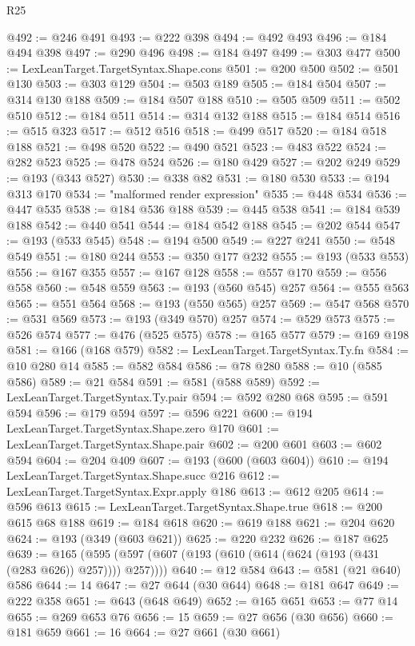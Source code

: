 \begin{lexlean}{R25}
\begin{coremodule}
@492 := @246 @491
@493 := @222 @398
@494 := @492 @493
@496 := @184 @494 @398
@497 := @290 @496
@498 := @184 @497
@499 := @303 @477
@500 := LexLeanTarget.TargetSyntax.Shape.cons
@501 := @200 @500
@502 := @501 @130
@503 := @303 @129
@504 := @503 @189
@505 := @184 @504
@507 := @314 @130 @188
@509 := @184 @507 @188
@510 := @505 @509
@511 := @502 @510
@512 := @184 @511
@514 := @314 @132 @188
@515 := @184 @514
@516 := @515 @323
@517 := @512 @516
@518 := @499 @517
@520 := @184 @518 @188
@521 := @498 @520
@522 := @490 @521
@523 := @483 @522
@524 := @282 @523
@525 := @478 @524
@526 := @180 @429
@527 := @202 @249
@529 := @193 (@343 @527)
@530 := @338 @82
@531 := @180 @530
@533 := @194 @313 @170
@534 := "malformed render expression"
@535 := @448 @534
@536 := @447 @535
@538 := @184 @536 @188
@539 := @445 @538
@541 := @184 @539 @188
@542 := @440 @541
@544 := @184 @542 @188
@545 := @202 @544
@547 := @193 (@533 @545)
@548 := @194 @500
@549 := @227 @241
@550 := @548 @549
@551 := @180 @244
@553 := @350 @177 @232
@555 := @193 (@533 @553)
@556 := @167 @355
@557 := @167 @128
@558 := @557 @170
@559 := @556 @558
@560 := @548 @559
@563 := @193 (@560 @545) @257
@564 := @555 @563
@565 := @551 @564
@568 := @193 (@550 @565) @257
@569 := @547 @568
@570 := @531 @569
@573 := @193 (@349 @570) @257
@574 := @529 @573
@575 := @526 @574
@577 := @476 (@525 @575)
@578 := @165 @577
@579 := @169 @198
@581 := @166 (@168 @579)
@582 := LexLeanTarget.TargetSyntax.Ty.fn
@584 := @10 @280 @14
@585 := @582 @584
@586 := @78 @280
@588 := @10 (@585 @586)
@589 := @21 @584
@591 := @581 (@588 @589)
@592 := LexLeanTarget.TargetSyntax.Ty.pair
@594 := @592 @280 @68
@595 := @591 @594
@596 := @179 @594
@597 := @596 @221
@600 := @194 LexLeanTarget.TargetSyntax.Shape.zero @170
@601 := LexLeanTarget.TargetSyntax.Shape.pair
@602 := @200 @601
@603 := @602 @594
@604 := @204 @409
@607 := @193 (@600 (@603 @604))
@610 := @194 LexLeanTarget.TargetSyntax.Shape.succ @216
@612 := LexLeanTarget.TargetSyntax.Expr.apply @186
@613 := @612 @205
@614 := @596 @613
@615 := LexLeanTarget.TargetSyntax.Shape.true
@618 := @200 @615 @68 @188
@619 := @184 @618
@620 := @619 @188
@621 := @204 @620
@624 := @193 (@349 (@603 @621))
@625 := @220 @232
@626 := @187 @625
@639 := @165 (@595 (@597 (@607 (@193 (@610 (@614 (@624 (@193 (@431 (@283 @626)) @257)))) @257))))
@640 := @12 @584
@643 := @581 (@21 @640) @586
@644 := 14
@647 := @27 @644 (@30 @644)
@648 := @181 @647
@649 := @222 @358
@651 := @643 (@648 @649)
@652 := @165 @651
@653 := @77 @14
@655 := @269 @653 @76
@656 := 15
@659 := @27 @656 (@30 @656)
@660 := @181 @659
@661 := 16
@664 := @27 @661 (@30 @661)

\end{coremodule}
\end{lexlean}
